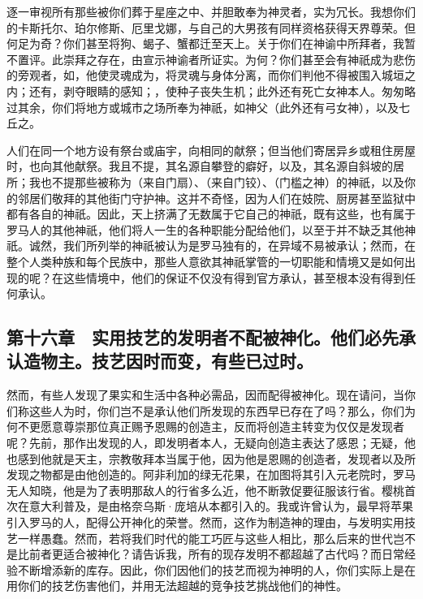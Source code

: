 逐一审视所有那些被你们葬于星座之中、并胆敢奉为神灵者，实为冗长。我想你们的卡斯托尔、珀尔修斯、厄里戈娜，与自己的大男孩有同样资格获得天界尊荣。但何足为奇？你们甚至将狗、蝎子、蟹都迁至天上。关于你们在神谕中所拜者，我暂不置评。此崇拜之存在，由宣示神谕者所证实。为何？你们甚至会有神祇成为悲伤的旁观者，如，他使灵魂成为，将灵魂与身体分离，而你们判他不得被围入城垣之内；还有，剥夺眼睛的感知；，使种子丧失生机；此外还有死亡女神本人。匆匆略过其余，你们将地方或城市之场所奉为神祇，如神父（此外还有弓女神），以及七丘之。\par

人们在同一个地方设有祭台或庙宇，向相同的献祭；但当他们寄居异乡或租住房屋时，也向其他献祭。我且不提，其名源自攀登的癖好，以及，其名源自斜坡的居所；我也不提那些被称为（来自门扇）、（来自门铰）、（门槛之神）的神祇，以及你的邻居们敬拜的其他街门守护神。这并不奇怪，因为人们在妓院、厨房甚至监狱中都有各自的神祇。因此，天上挤满了无数属于它自己的神祇，既有这些，也有属于罗马人的其他神祇，他们将人一生的各种职能分配给他们，以至于并不缺乏其他神祇。诚然，我们所列举的神祇被认为是罗马独有的，在异域不易被承认；然而，在整个人类种族和每个民族中，那些人意欲其神祇掌管的一切职能和情境又是如何出现的呢？在这些情境中，他们的保证不仅没有得到官方承认，甚至根本没有得到任何承认。\par


\subsection{第十六章　实用技艺的发明者不配被神化。他们必先承认造物主。技艺因时而变，有些已过时。}

然而，有些人发现了果实和生活中各种必需品，因而配得被神化。现在请问，当你们称这些人为时，你们岂不是承认他们所发现的东西早已存在了吗？那么，你们为何不更愿意尊崇那位真正赐予恩赐的创造主，反而将创造主转变为仅仅是发现者呢？先前，那作出发现的人，即发明者本人，无疑向创造主表达了感恩；无疑，他也感到他就是天主，宗教敬拜本当属于他，因为他是恩赐的创造者，发现者以及所发现之物都是由他创造的。阿非利加的绿无花果，在加图将其引入元老院时，罗马无人知晓，他是为了表明那敌人的行省多么近，他不断敦促要征服该行省。樱桃首次在意大利普及，是由格奈乌斯·庞培从本都引入的。我或许曾认为，最早将苹果引入罗马的人，配得公开神化的荣誉。然而，这作为制造神的理由，与发明实用技艺一样愚蠢。然而，若将我们时代的能工巧匠与这些人相比，那么后来的世代岂不是比前者更适合被神化？请告诉我，所有的现存发明不都超越了古代吗？而日常经验不断增添新的库存。因此，你们因他们的技艺而视为神明的人，你们实际上是在用你们的技艺伤害他们，并用无法超越的竞争技艺挑战他们的神性。\par

